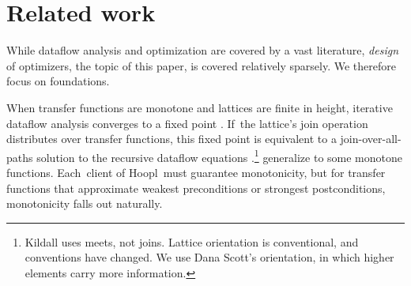 \documentclass[blockstyle,preprint,natbib,nocopyrightspace]{sigplanconf}
\newcommand\ourlib{Hoopl}  %
\let\hoopl\ourlib
\let\cite\citep
\newcommand\secref[1]{Section~\ref{sec:#1}}
\begin{document}








\section {Related work}

While dataflow analysis and optimization are covered
by a vast literature, 
\emph{design} of optimizers, the topic of this paper, is covered
relatively sparsely.
We therefore focus on foundations.

When transfer functions are monotone and lattices are finite in height,
iterative dataflow analysis converges to a fixed point
\cite{kam-ullman:global-iterative-analysis}. 
If~the lattice's join operation distributes over transfer
functions,
this fixed point is equivalent to a join-over-all-paths solution to
the recursive dataflow equations
\cite{kildall:unified-optimization}.\footnote
{Kildall uses meets, not joins.  
Lattice orientation is conventional, and conventions have changed.
We use Dana Scott's
orientation, in which higher elements carry more information.}
\cite{kam-ullman:monotone-flow-analysis} generalize to some
monotone functions.
Each~client of \hoopl\ must guarantee monotonicity,
but for transfer functions that
approximate weakest preconditions or strongest postconditions,
monotonicity falls out naturally.
\end{document}

